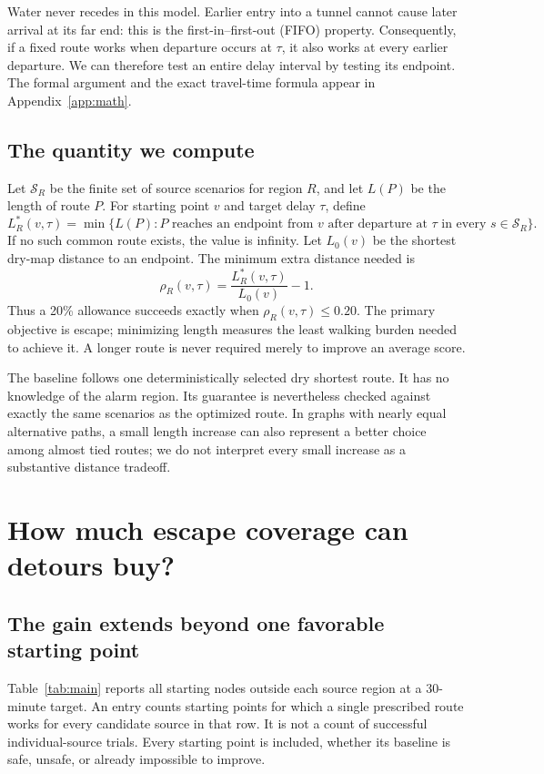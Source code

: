 \documentclass[11pt,a4paper]{article}
\newcommand{\Sc}{\mathcal{S}}
\begin{document}
Water never recedes in this model. Earlier entry into a tunnel cannot cause later arrival at its far end: this is the first-in--first-out (FIFO) property. Consequently, if a fixed route works when departure occurs at $\tau$, it also works at every earlier departure. We can therefore test an entire delay interval by testing its endpoint. The formal argument and the exact travel-time formula appear in Appendix~\ref{app:math}.

\subsection{The quantity we compute}
Let $\Sc_R$ be the finite set of source scenarios for region $R$, and let $L(P)$ be the length of route $P$. For starting point $v$ and target delay $\tau$, define
\begin{equation}
 L_R^*(v,\tau)=\min\{L(P):P\text{ reaches an endpoint from }v
 \text{ after departure at }\tau\text{ in every }s\in\Sc_R\}.
 \label{eq:main}
\end{equation}
If no such common route exists, the value is infinity. Let $L_0(v)$ be the shortest dry-map distance to an endpoint. The minimum extra distance needed is
\[
 \rho_R(v,\tau)=\frac{L_R^*(v,\tau)}{L_0(v)}-1.
\]
Thus a 20\% allowance succeeds exactly when $\rho_R(v,\tau)\le0.20$. The primary objective is escape; minimizing length measures the least walking burden needed to achieve it. A longer route is never required merely to improve an average score.

The baseline follows one deterministically selected dry shortest route. It has no knowledge of the alarm region. Its guarantee is nevertheless checked against exactly the same scenarios as the optimized route. In graphs with nearly equal alternative paths, a small length increase can also represent a better choice among almost tied routes; we do not interpret every small increase as a substantive distance tradeoff.

\section{How much escape coverage can detours buy?}\label{sec:results}
\subsection{The gain extends beyond one favorable starting point}
Table~\ref{tab:main} reports all starting nodes outside each source region at a 30-minute target. An entry counts starting points for which a single prescribed route works for every candidate source in that row. It is not a count of successful individual-source trials. Every starting point is included, whether its baseline is safe, unsafe, or already impossible to improve.
\end{document}
